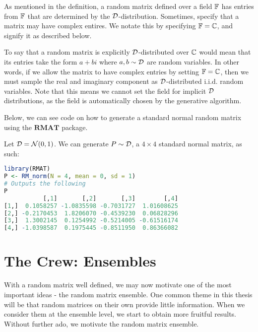 As mentioned in the definition, a random matrix defined over a field $\mathbb{F}$ has entries from $\mathbb{F}$ that are determined by the $\mathcal{D}$-distribution.
Sometimes, specify that a matrix may have complex entires. We notate this by specifying $\mathbb{F} = \mathbb{C}$, and signify it as described below.

\begin{remark}
To say that a random matrix is explicitly $\mathcal{D}$-distributed over $\mathbb{C}$ would mean that its entries take the form $a + bi$ where $a,b \sim \mathcal{D}$ are random variables.
In other words, if we allow the matrix to have complex entries by setting $\mathbb{F} = \mathbb{C}$, then we must sample the real and imaginary component as $\mathcal{D}$-distributed i.i.d. random variables.
Note that this means we cannot set the field for implicit $\mathcal{D}$ distributions, as the field is automatically chosen by the generative algorithm.
\end{remark}

\medskip
\noindent Below, we can see code on how to generate a standard normal random matrix using the $\textbf{RMAT}$ package.
\begin{code}
Let $\mathcal{D} = \mathcal{N}(0,1)$. We can generate $P \sim \mathcal{D}$, a $4 \times 4$ standard normal matrix, as such:
\end{code}

\begin{lstlisting}[language=R]
library(RMAT)
P <- RM_norm(N = 4, mean = 0, sd = 1)
# Outputs the following
P
           [,1]       [,2]       [,3]        [,4]
[1,]  0.1058257 -1.0835598 -0.7031727  1.01608625
[2,] -0.2170453  1.8206070 -0.4539230  0.06828296
[3,]  1.3002145  0.1254992 -0.5214005 -0.61516174
[4,] -1.0398587  0.1975445 -0.8511950  0.86366082
\end{lstlisting}


\newpage


\section{The Crew: Ensembles}

With a random matrix well defined, we may now motivate one of the most important ideas - the random matrix ensemble. One common theme in this thesis will be that random matrices on their own provide little information. When we consider them at the ensemble level, we start to obtain more fruitful results. Without further ado, we motivate the random matrix ensemble.

